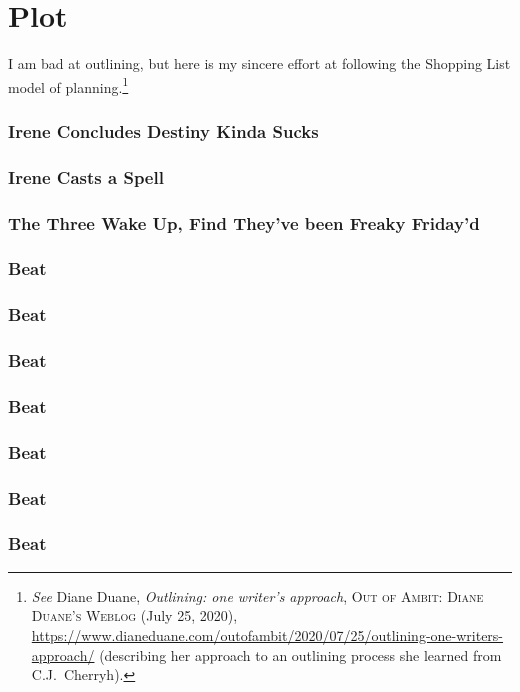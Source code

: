 \documentclass[../FGP.tex]{subfiles}
\begin{document}
\part{Plot}
I am bad at outlining, but here is my sincere effort at following the Shopping List model of planning.\footnote{\textit{See} Diane Duane, \textit{Outlining: one writer’s approach}, \textsc{Out of Ambit: Diane Duane's Weblog} (July 25, 2020), \url{https://www.dianeduane.com/outofambit/2020/07/25/outlining-one-writers-approach/} (describing her approach to an outlining process she learned from C.J.~Cherryh).}
\section{Irene Concludes Destiny Kinda Sucks}
\section{Irene Casts a Spell}
\section{The Three Wake Up, Find They've been Freaky Friday'd}
\section{Beat}
\section{Beat}
\section{Beat}
\section{Beat}
\section{Beat}
\section{Beat}
\section{Beat}
\end{document}
